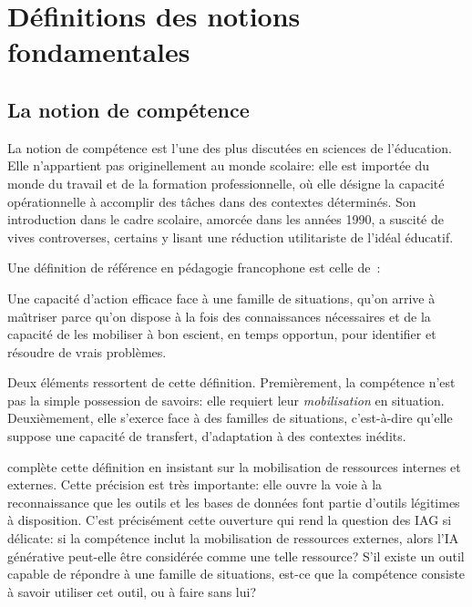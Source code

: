 
\section{D\'efinitions des notions fondamentales}\label{sec:definitions}

\subsection{La notion de comp\'etence}

La notion de comp\'etence est l'une des plus discut\'ees en sciences de l'\'education. 
Elle n'appartient pas originellement au monde scolaire: elle est importée du monde du travail et de la formation professionnelle, o\`u elle d\'esigne la capacit\'e op\'erationnelle \`a accomplir des t\^aches dans des contextes d\'etermin\'es. 
Son introduction dans le cadre scolaire, amorc\'ee dans les ann\'ees 1990, a suscit\'e de vives controverses, certains y lisant une r\'eduction utilitariste de l'id\'eal \'educatif.

Une d\'efinition de r\'ef\'erence en p\'edagogie francophone est celle de~\cite{perrenoud2011construire}:

\begin{displayquote}
Une capacit\'e d'action efficace face \`a une famille de situations, qu'on arrive \`a ma\^\i triser parce qu'on dispose \`a la fois des connaissances n\'ecessaires et de la capacit\'e de les mobiliser \`a bon escient, en temps opportun, pour identifier et r\'esoudre de vrais probl\`emes.
\end{displayquote}


Deux \'el\'ements ressortent de cette d\'efinition. 
Premi\`erement, la comp\'etence n'est pas la simple possession de savoirs: elle requiert leur \emph{mobilisation} en situation.
Deuxi\`emement, elle s'exerce face \`a des \og{}familles de situations\fg{}, c'est-\`a-dire qu'elle suppose une capacit\'e de transfert, d'adaptation \`a des contextes in\'edits.

\cite{tardif2006evaluation}compl\`ete cette d\'efinition en insistant sur la mobilisation de \og{}ressources internes et externes\fg{}. %
Cette pr\'ecision est très importante: elle ouvre la voie \`a la reconnaissance que les outils et les bases de donn\'ees font partie d'outils légitimes à disposition. 
C'est pr\'ecis\'ement cette ouverture qui rend la question des IAG si d\'elicate: si la comp\'etence inclut la mobilisation de ressources externes, alors l'IA g\'en\'erative peut-elle \^etre consid\'er\'ee comme une telle ressource? S'il existe un outil capable de répondre à une famille de situations, est-ce que la comp\'etence consiste à savoir utiliser cet outil, ou à faire sans lui?

